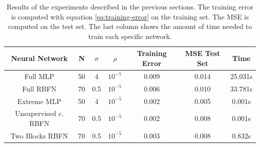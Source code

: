 \documentclass[a4paper]{article}
\numberwithin{equation}{section} %
\numberwithin{figure}{section} %
\numberwithin{table}{section} %
\theoremstyle{definition}
\begin{document}
\begin{table}
	\footnotesize
	\centering
	\begin{tabular}{*{7}{c}}
		Neural Network & N & $\sigma$ & $\rho$ & Training Error & MSE Test Set & Time \\
		\hline
		Full MLP & 50 & 4 & $10^{-5}$ & 0.009 & 0.014 & 25.031s \\
		Full RBFN & 70 & 0.5 & $10^{-5}$ & 0.006 & 0.010 & 33.781s \\
		Extreme MLP & 50 & 4 & $10^{-5}$ & 0.002 & 0.005 & 0.001s \\
		Unsupervised c. RBFN & 70 & 0.5 & $10^{-5}$ & 0.002 & 0.008 & 0.001s \\
		Two Blocks RBFN & 70 & 0.5 & $10^{-5}$ & 0.003 & 0.008 & 0.832s \\
	\end{tabular}
	\caption{Results of the experiments described in the previous sections.
    The training error is computed with equation \ref{eq:training-error} on
    the training set. The MSE is computed on the test set.
		The last column shows the amount of time needed to train each
		specific network.}
	\label{tab:experiments}
\end{table}
\end{document}

